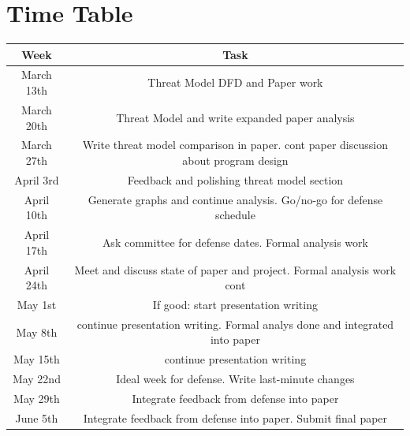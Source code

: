 \documentclass [11pt, proquest] {uwthesis}[2020/02/24]
\begin{document}
\section {Time Table}
\begin{center}
\begin{tabular}{ |c|c| } 
 \hline
Week & Task \\
 \hline
March 13th & Threat Model DFD and Paper work \\ 
  \hline
March 20th & Threat Model and write expanded paper analysis  \\ 
  \hline
March 27th & Write threat model comparison in paper. 
cont paper discussion about program design   \\  
 \hline
April 3rd & Feedback and polishing threat model section  \\  
 \hline
April 10th & Generate graphs and continue analysis. Go/no-go for defense schedule  \\  
 \hline
April 17th & Ask committee for defense dates. Formal analysis work  \\  
 \hline
April 24th & Meet and discuss state of paper and project. Formal analysis work cont  \\  
 \hline
May 1st  & If good: start presentation writing  \\  
 \hline
May 8th  & continue presentation writing. Formal analys done and integrated into paper  \\  
 \hline
May 15th  & continue presentation writing   \\  
 \hline
May 22nd  & Ideal week for defense. Write last-minute changes  \\  
 \hline
May 29th  & Integrate feedback from defense into paper  \\  
 \hline
June 5th  & Integrate feedback from defense into paper. 
Submit final paper \\  
 \hline
 
\end{tabular}
\end{center}



\end{document}

